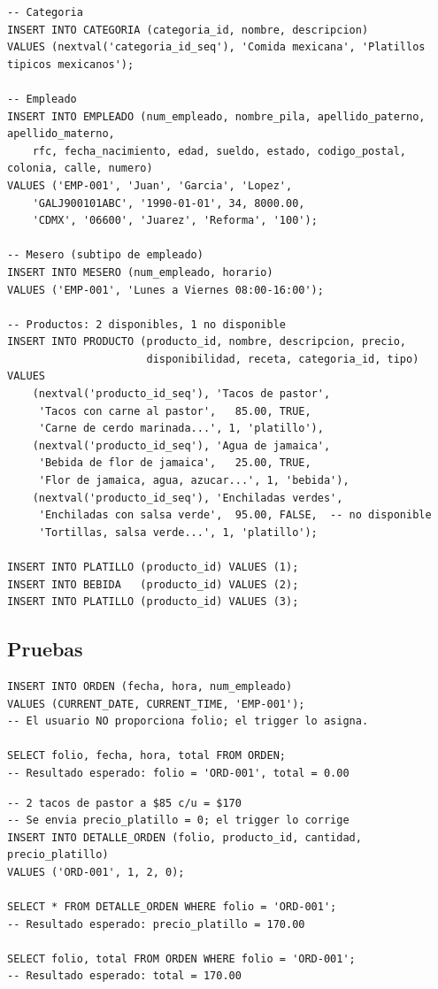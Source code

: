 \documentclass[12pt, a4paper]{article}
\begin{document}
\begin{lstlisting}[caption={Inserci\'on de datos de prueba}]
-- Categoria
INSERT INTO CATEGORIA (categoria_id, nombre, descripcion)
VALUES (nextval('categoria_id_seq'), 'Comida mexicana', 'Platillos tipicos mexicanos');

-- Empleado
INSERT INTO EMPLEADO (num_empleado, nombre_pila, apellido_paterno, apellido_materno,
    rfc, fecha_nacimiento, edad, sueldo, estado, codigo_postal, colonia, calle, numero)
VALUES ('EMP-001', 'Juan', 'Garcia', 'Lopez',
    'GALJ900101ABC', '1990-01-01', 34, 8000.00,
    'CDMX', '06600', 'Juarez', 'Reforma', '100');

-- Mesero (subtipo de empleado)
INSERT INTO MESERO (num_empleado, horario)
VALUES ('EMP-001', 'Lunes a Viernes 08:00-16:00');

-- Productos: 2 disponibles, 1 no disponible
INSERT INTO PRODUCTO (producto_id, nombre, descripcion, precio,
                      disponibilidad, receta, categoria_id, tipo)
VALUES
    (nextval('producto_id_seq'), 'Tacos de pastor',
     'Tacos con carne al pastor',   85.00, TRUE,
     'Carne de cerdo marinada...', 1, 'platillo'),
    (nextval('producto_id_seq'), 'Agua de jamaica',
     'Bebida de flor de jamaica',   25.00, TRUE,
     'Flor de jamaica, agua, azucar...', 1, 'bebida'),
    (nextval('producto_id_seq'), 'Enchiladas verdes',
     'Enchiladas con salsa verde',  95.00, FALSE,  -- no disponible
     'Tortillas, salsa verde...', 1, 'platillo');

INSERT INTO PLATILLO (producto_id) VALUES (1);
INSERT INTO BEBIDA   (producto_id) VALUES (2);
INSERT INTO PLATILLO (producto_id) VALUES (3);
\end{lstlisting}

\subsection{Pruebas}

\begin{lstlisting}[caption={Prueba 1: Folio autom\'atico}]
INSERT INTO ORDEN (fecha, hora, num_empleado)
VALUES (CURRENT_DATE, CURRENT_TIME, 'EMP-001');
-- El usuario NO proporciona folio; el trigger lo asigna.

SELECT folio, fecha, hora, total FROM ORDEN;
-- Resultado esperado: folio = 'ORD-001', total = 0.00
\end{lstlisting}

\begin{lstlisting}[caption={Prueba 2: INSERT con producto disponible}]
-- 2 tacos de pastor a $85 c/u = $170
-- Se envia precio_platillo = 0; el trigger lo corrige
INSERT INTO DETALLE_ORDEN (folio, producto_id, cantidad, precio_platillo)
VALUES ('ORD-001', 1, 2, 0);

SELECT * FROM DETALLE_ORDEN WHERE folio = 'ORD-001';
-- Resultado esperado: precio_platillo = 170.00

SELECT folio, total FROM ORDEN WHERE folio = 'ORD-001';
-- Resultado esperado: total = 170.00
\end{lstlisting}
\end{document}
